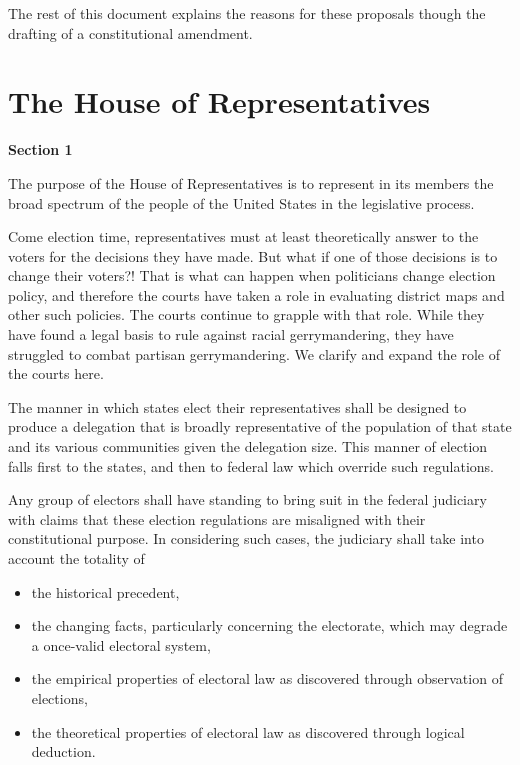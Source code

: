 \documentclass{article}
\begin{document}
The rest of this document explains the reasons for these proposals though the drafting of a constitutional amendment.

\section{The House of Representatives}

\begin{quoting}
\textbf{Section 1}

The purpose of the House of Representatives is to represent in its members the broad spectrum of the people of the United States in the legislative process.
\end{quoting}

Come election time, representatives must at least theoretically answer to the voters for the decisions they have made. But what if one of those decisions is to change their voters?! That is what can happen when politicians change election policy, and therefore the courts have taken a role in evaluating district maps and other such policies. The courts continue to grapple with that role. While they have found a legal basis to rule against racial gerrymandering, they have struggled to combat partisan gerrymandering\cite{Brewer}. We clarify and expand the role of the courts here.

\begin{quoting}
The manner in which states elect their representatives shall be designed to produce a delegation that is broadly representative of the population of that state and its various communities given the delegation size. This manner of election falls first to the states, and then to federal law which override such regulations.

Any group of electors shall have standing to bring suit in the federal judiciary with claims that these election regulations are misaligned with their constitutional purpose. In considering such cases, the judiciary shall take into account the totality of
\begin{itemize}
\item the historical precedent,
\item the changing facts, particularly concerning the electorate, which may degrade a once-valid electoral system,
\item the empirical properties of electoral law as discovered through observation of elections,
\item the theoretical properties of electoral law as discovered through logical deduction.
\end{itemize}
\end{quoting}
\end{document}
